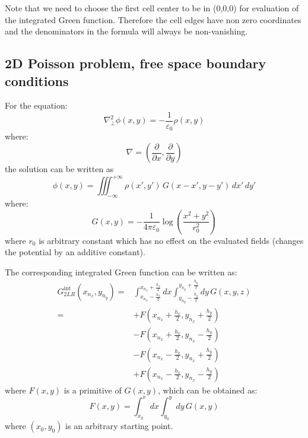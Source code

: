 Note that we need to choose the first cell center to be in (0,0,0) for evaluation of the integrated Green function. Therefore the cell edges have non zero coordinates and the denominators in the formula will always be non-vanishing.

\subsection*{2D Poisson problem, free space boundary conditions}

For the equation:
\begin{equation}
\nabla_\perp^2 \phi(x,y) = -\frac{1}{\varepsilon_0} \rho(x,y)
\end{equation}
where:
\begin{equation}
\nabla = \left(\frac{\partial}{\partial x}, 
                      \frac{\partial}{\partial y} \right)
\end{equation}
the solution can be written as 
\begin{equation}
\phi(x, y) = \iiint_{-\infty}^{+\infty} \rho(x', y')
   \,G(x-x', y-y')\,dx'\,dy'
\end{equation}
where:
\begin{equation}
G(x, y) = -\frac{1}{4\pi\varepsilon_0} \log\left( \frac{x^2 + y^2}{r_0^2}\right)
\end{equation}
where $r_0$ is arbitrary constant which has no effect on the evaluated fields (changes the potential by an additive constant). 

The corresponding integrated Green function can be written as:
\begin{align}
G_{2LR}^\text{int}(x_{n_x}, y_{n_y}) =& 
\int_{x_{n_x}-\frac{h_x}{2}}^{x_{n_x}+\frac{h_x}{2}} dx
\int_{y_{n_y}-\frac{h_y}{2}}^{y_{n_y}+\frac{h_y}{2}} dy\,
G(x,y,z)\\
= &+F\left(x_{n_x}+\frac{h_x}{2}, y_{n_x}+\frac{h_y}{2}\right)\\
    &-F\left(x_{n_x}+\frac{h_x}{2}, y_{n_x}-\frac{h_y}{2}\right)\\
    &-F\left(x_{n_x}-\frac{h_x}{2}, y_{n_x}+\frac{h_y}{2}\right)\\ 
    &+F\left(x_{n_x}-\frac{h_x}{2}, y_{n_x}-\frac{h_y}{2}\right)
\end{align}
where $F(x,y)$ is a primitive of $G(x,y)$, which can be obtained as:
\begin{equation}
F(x,y) = 
\int_{x_0}^{x} dx
\int_{y_0}^{y} dy\,
G(x,y)
\end{equation}
where $(x_0, y_0)$ is an arbitrary starting point.

